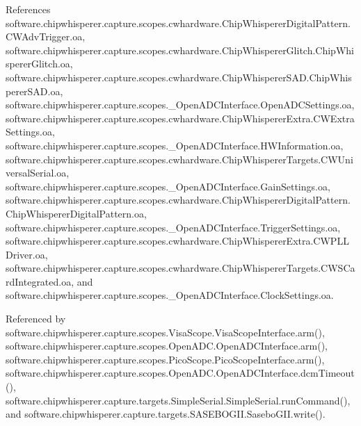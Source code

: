 References software.\+chipwhisperer.\+capture.\+scopes.\+cwhardware.\+Chip\+Whisperer\+Digital\+Pattern.\+C\+W\+Adv\+Trigger.\+oa, software.\+chipwhisperer.\+capture.\+scopes.\+cwhardware.\+Chip\+Whisperer\+Glitch.\+Chip\+Whisperer\+Glitch.\+oa, software.\+chipwhisperer.\+capture.\+scopes.\+cwhardware.\+Chip\+Whisperer\+S\+A\+D.\+Chip\+Whisperer\+S\+A\+D.\+oa, software.\+chipwhisperer.\+capture.\+scopes.\+\_\+\+Open\+A\+D\+C\+Interface.\+Open\+A\+D\+C\+Settings.\+oa, software.\+chipwhisperer.\+capture.\+scopes.\+cwhardware.\+Chip\+Whisperer\+Extra.\+C\+W\+Extra\+Settings.\+oa, software.\+chipwhisperer.\+capture.\+scopes.\+\_\+\+Open\+A\+D\+C\+Interface.\+H\+W\+Information.\+oa, software.\+chipwhisperer.\+capture.\+scopes.\+cwhardware.\+Chip\+Whisperer\+Targets.\+C\+W\+Universal\+Serial.\+oa, software.\+chipwhisperer.\+capture.\+scopes.\+\_\+\+Open\+A\+D\+C\+Interface.\+Gain\+Settings.\+oa, software.\+chipwhisperer.\+capture.\+scopes.\+cwhardware.\+Chip\+Whisperer\+Digital\+Pattern.\+Chip\+Whisperer\+Digital\+Pattern.\+oa, software.\+chipwhisperer.\+capture.\+scopes.\+\_\+\+Open\+A\+D\+C\+Interface.\+Trigger\+Settings.\+oa, software.\+chipwhisperer.\+capture.\+scopes.\+cwhardware.\+Chip\+Whisperer\+Extra.\+C\+W\+P\+L\+L\+Driver.\+oa, software.\+chipwhisperer.\+capture.\+scopes.\+cwhardware.\+Chip\+Whisperer\+Targets.\+C\+W\+S\+Card\+Integrated.\+oa, and software.\+chipwhisperer.\+capture.\+scopes.\+\_\+\+Open\+A\+D\+C\+Interface.\+Clock\+Settings.\+oa.



Referenced by software.\+chipwhisperer.\+capture.\+scopes.\+Visa\+Scope.\+Visa\+Scope\+Interface.\+arm(), software.\+chipwhisperer.\+capture.\+scopes.\+Open\+A\+D\+C.\+Open\+A\+D\+C\+Interface.\+arm(), software.\+chipwhisperer.\+capture.\+scopes.\+Pico\+Scope.\+Pico\+Scope\+Interface.\+arm(), software.\+chipwhisperer.\+capture.\+scopes.\+Open\+A\+D\+C.\+Open\+A\+D\+C\+Interface.\+dcm\+Timeout(), software.\+chipwhisperer.\+capture.\+targets.\+Simple\+Serial.\+Simple\+Serial.\+run\+Command(), and software.\+chipwhisperer.\+capture.\+targets.\+S\+A\+S\+E\+B\+O\+G\+I\+I.\+Sasebo\+G\+I\+I.\+write().


